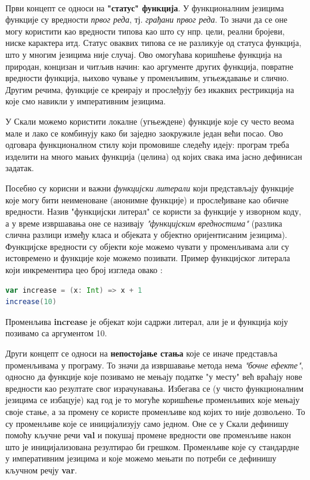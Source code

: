\documentclass[12pt,oneside]{memoir}
\begin{document}
\\
\par Први концепт се односи на \textbf{"статус" функција}. У функционалним језицима функције су вредности \textit{првог реда}, тј. \textit{грађани првог реда}. То значи да се оне могу користити као вредности типова као што су нпр. цели, реални бројеви, ниске карактера итд. Статус оваквих типова се не разликује од статуса функција, што у многим језицима није случај. Ово омогућава коришћење функција на природан, концизан и читљив начин: као аргументе других функција, повратне вредности функција, њихово чување у променљивим, угњеждавање и слично. Другим речима, функције се креирају и прослеђују без икаквих рестрикција на које смо навикли у императивним језицима.
\par У Скали можемо користити локалне (угњеждене) функције које су често веома мале и лако се комбинују како би заједно заокружиле један већи посао. Ово одговара функционалном стилу који промовише следећу идеју: програм треба изделити на много мањих функција (целина) од којих свака има јасно дефинисан задатак.
\par Посебно су корисни и важни \textit{функцијски литерали} који представљају функције које могу бити неименоване (анонимне функције) и прослеђиване као обичне вредности. Назив "функцијски литерал" се користи за функције у изворном коду, а у време извршавања оне се називају \textit{"функцијским вредностима"} (разлика слична разлици између класа и објеката у објектно оријентисаним језицима). Функцијске вредности су објекти које можемо чувати у променљивама али су истовремено и функције које можемо позивати. Пример функцијског литерала који инкрементира цео број изгледа овако \cite{progInScala}:
\begin{lstlisting}[language=Scala]
var increase = (x: Int) => x + 1
increase(10)
\end{lstlisting}
Променљива \textbf{increase} је објекат који садржи литерал, али је и функција коју позивамо са аргументом 10.
\\
\par Други концепт се односи на \textbf{непостојање стања} које се иначе представља променљивама у програму. То значи да извршавање метода нема\textit{ "бочне ефекте"}, односно да функције које позивамо не мењају податке "у месту" већ враћају нове вредности као резултате свог израчунавања. Избегава се (у чисто функционалним језицима се избацује) кад год је то могуће коришћење променљивих које мењају своје стање, а за промену се користе променљиве код којих то није дозвољено. То су променљиве које се иницијализују само једном. Оне се у Скали дефинишу помоћу кључне речи \textbf{val} и покушај промене вредности ове променљиве након што је иницијализована резултирао би грешком. Променљиве које су стандардне у императивним језицима и које можемо мењати по потреби се дефинишу кључном речју \textbf{var}.
\end{document}
